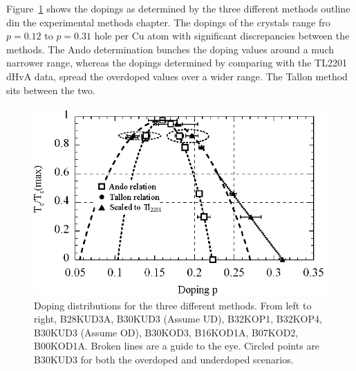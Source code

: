 Figure~\ref{Fig:ExpH:Dopings} shows the dopings as determined by the three different methods outline din the experimental methods chapter. The dopings of the crystals range fro $p=0.12$ to $p=0.31$ hole per Cu atom with significant discrepancies between the methods. The Ando determination bunches the doping values around a much narrower range, whereas the dopings determined by comparing with the \ac{TL2201} \ac{dHvA} data, spread the overdoped values over a wider range. The Tallon method sits between the two.

\begin{figure}[htbp]
    \begin{center}
        \includegraphics[scale=1.1]{Chapter-HallBSCO/Figures/Dopings/Dopings}
        \caption{Doping distributions for the three different methods. From left to right, B28KUD3A, B30KUD3 (Assume UD), B32KOP1, B32KOP4, B30KUD3 (Assume OD), B30KOD3, B16KOD1A, B07KOD2, B00KOD1A. Broken lines are a guide to the eye. Circled points are B30KUD3 for both the overdoped and underdoped scenarios.}
        \label{Fig:ExpH:Dopings}
    \end{center}
\end{figure}

